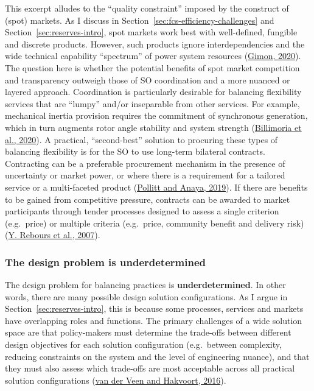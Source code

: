 \documentclass[12pt,a4paper,]{report}
\begin{document}
This excerpt alludes to the ``quality constraint'' imposed by the
construct of (spot) markets. As I discuss in
Section~\ref{sec:fcs-efficiency-challenges} and
Section~\ref{sec:reserves-intro}, spot markets work best with
well-defined, fungible and discrete products. However, such products
ignore interdependencies and the wide technical capability ``spectrum''
of power system resources
(\protect\hyperlink{ref-gimonGridPhysicsMarkets2020}{Gimon, 2020}). The
question here is whether the potential benefits of spot market
competition and transparency outweigh those of SO coordination and a
more nuanced or layered approach. Coordination is particularly desirable
for balancing flexibility services that are ``lumpy'' and/or inseparable
from other services. For example, mechanical inertia provision requires
the commitment of synchronous generation, which in turn augments rotor
angle stability and system strength
(\protect\hyperlink{ref-billimoriaMarketDesignSystem2020}{Billimoria et
al., 2020}). A practical, ``second-best'' solution to procuring these
types of balancing flexibility is for the SO to use long-term bilateral
contracts. Contracting can be a preferable procurement mechanism in the
presence of uncertainty or market power, or where there is a requirement
for a tailored service or a multi-faceted product
(\protect\hyperlink{ref-pollittCompetitionMarketsAncillary2019}{Pollitt
and Anaya, 2019}). If there are benefits to be gained from competitive
pressure, contracts can be awarded to market participants through tender
processes designed to assess a single criterion (e.g.~price) or multiple
criteria (e.g.~price, community benefit and delivery risk)
(\protect\hyperlink{ref-reboursFundamentalDesignIssues2007}{Y. Rebours
et al., 2007}).

\hypertarget{the-design-problem-is-underdetermined}{%
\subsubsection{The design problem is
underdetermined}\label{the-design-problem-is-underdetermined}}

The design problem for balancing practices is \textbf{underdetermined}.
In other words, there are many possible design solution configurations.
As I argue in Section~\ref{sec:reserves-intro}, this is because some
processes, services and markets have overlapping roles and functions.
The primary challenges of a wide solution space are that policy-makers
must determine the trade-offs between different design objectives for
each solution configuration (e.g.~between complexity, reducing
constraints on the system and the level of engineering nuance), and that
they must also assess which trade-offs are most acceptable across all
practical solution configurations
(\protect\hyperlink{ref-vanderveenElectricityBalancingMarket2016}{van
der Veen and Hakvoort, 2016}).
\end{document}
